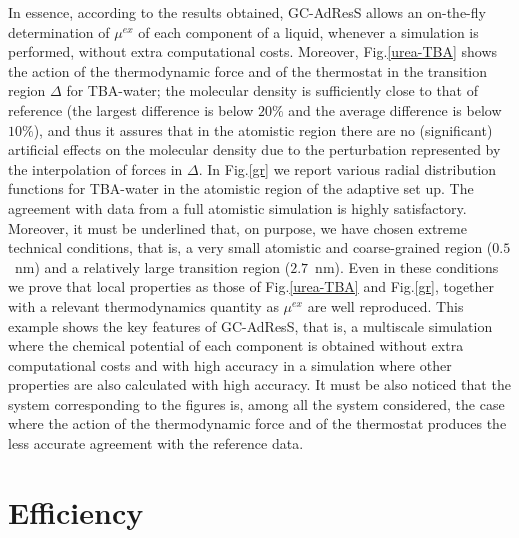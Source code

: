 \documentclass[a4paper,preprint,unsortedaddress]{revtex4-1}
\begin{document}
In essence, according to the results obtained, GC-AdResS allows an on-the-fly determination of $\mu^{ex}$ of each component of a liquid, whenever a simulation is performed, without extra computational costs.
Moreover, Fig.\ref{urea-TBA} shows the action of the thermodynamic force and of the thermostat in the transition region $\Delta$ for TBA-water; the molecular density is sufficiently close to that of reference (the largest difference is below $20\%$ and the average difference is below $10\%$), and thus it assures that in the atomistic region there are no (significant) artificial effects on the molecular density due to the perturbation represented by the interpolation of forces in $\Delta$. In Fig.\ref{gr} we report various radial distribution functions for TBA-water in the atomistic region of the adaptive set up. The agreement with data from a full atomistic simulation is highly satisfactory. Moreover, it must be underlined that, on purpose, we have chosen extreme technical conditions, that is, a very small atomistic and coarse-grained region ($0.5$~nm) and a relatively large transition region ($2.7$~nm). Even in these conditions we prove that local properties as those of Fig.\ref{urea-TBA} and Fig.\ref{gr}, together with a relevant thermodynamics quantity as $\mu^{ex}$ are well reproduced.
This example shows the key features of GC-AdResS, that is, a multiscale simulation where the chemical potential of each component is obtained without extra computational costs and with high accuracy in a simulation where other properties are also calculated with high accuracy. It must be also noticed that the system corresponding to the figures is, among all the system considered, the case where the action of the thermodynamic force and of the thermostat produces the less accurate agreement with the reference data.

\section{Efficiency}
\end{document}
